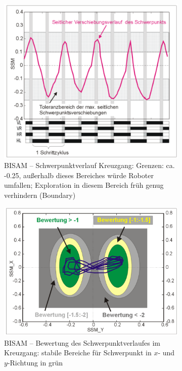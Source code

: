 \begin{figure}
	\centering
	\begin{subfigure}{.4\textwidth}
		\includegraphics[width=\textwidth]{figures/bisam_schwerpunktverlauf_kreuzgang.png}
		\caption{BISAM -- Schwerpunktverlauf Kreuzgang: Grenzen: ca. -0.25, außerhalb dieses Bereiches würde Roboter umfallen; Exploration in diesem Bereich früh genug verhindern (Boundary)}
	\end{subfigure}
	\begin{subfigure}{.4\textwidth}
		\includegraphics[width=\textwidth]{figures/bisam_schwerpunktverlauf_kreuzgang_1.png}
		\caption{BISAM -- Bewertung des Schwerpunktverlaufes im Kreuzgang: stabile Bereiche für Schwerpunkt in $x$- und $y$-Richtung in grün}
	\end{subfigure}
	\caption{}
\end{figure}

